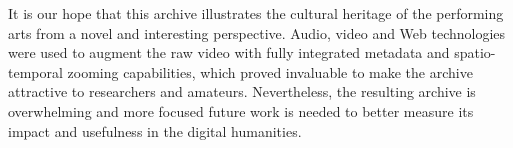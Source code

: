 \documentclass[conference]{IEEEtran}
\newcommand{\todo}[1]{\noindent\textcolor{red}{{\bf \{ToDo} #1{\bf \}}}}
\begin{document}
It is our hope that this archive illustrates the cultural heritage of the performing arts from a novel and 
interesting perspective. Audio, video and Web technologies were used to augment
the raw video with fully integrated metadata and spatio-temporal zooming capabilities,
which proved invaluable to make the archive attractive to researchers and amateurs.
Nevertheless, the resulting archive is overwhelming and more focused future work is needed to 
better measure its impact and usefulness in the digital humanities. 


















\end{document}
